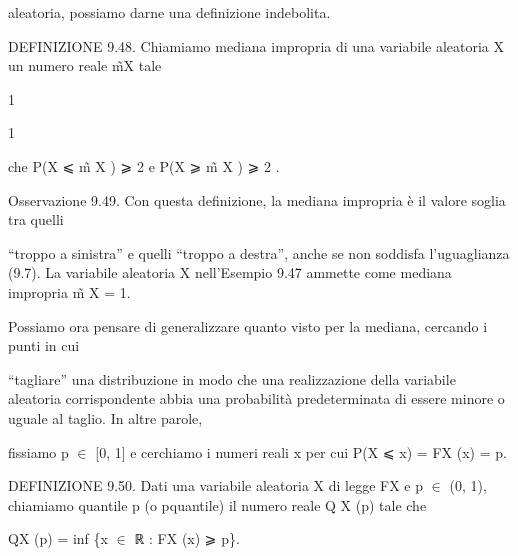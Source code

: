 \documentclass[a4paper,portrait,12pt]{article}
\begin{document}
\begin{flushleft}
aleatoria, possiamo darne una definizione indebolita.
\end{flushleft}


\begin{flushleft}
DEFINIZIONE 9.48. Chiamiamo mediana impropria di una variabile aleatoria X un numero reale m̃X tale
\end{flushleft}


1


1


\begin{flushleft}
che P(X ⩽ m̃ X ) ⩾ 2 e P(X ⩾ m̃ X ) ⩾ 2 .
\end{flushleft}


\begin{flushleft}
Osservazione 9.49. Con questa definizione, la mediana impropria \`{e} il valore soglia tra quelli
\end{flushleft}


\begin{flushleft}
{``}troppo a sinistra'' e quelli {``}troppo a destra'', anche se non soddisfa l'uguaglianza (9.7). La variabile aleatoria X nell'Esempio 9.47 ammette come mediana impropria m̃ X = 1.
\end{flushleft}


\begin{flushleft}
Possiamo ora pensare di generalizzare quanto visto per la mediana, cercando i punti in cui
\end{flushleft}


\begin{flushleft}
{``}tagliare'' una distribuzione in modo che una realizzazione della variabile aleatoria corrispondente abbia una probabilit\`{a} predeterminata di essere minore o uguale al taglio. In altre parole,
\end{flushleft}


\begin{flushleft}
fissiamo p $\in$ [0, 1] e cerchiamo i numeri reali x per cui P(X ⩽ x) = FX (x) = p.
\end{flushleft}


\begin{flushleft}
DEFINIZIONE 9.50. Dati una variabile aleatoria X di legge FX e p $\in$ (0, 1), chiamiamo quantile p (o pquantile) il numero reale Q X (p) tale che
\end{flushleft}


\begin{flushleft}
QX (p) = inf \{x $\in$ ℝ : FX (x) ⩾ p\}.
\end{flushleft}
\end{document}
